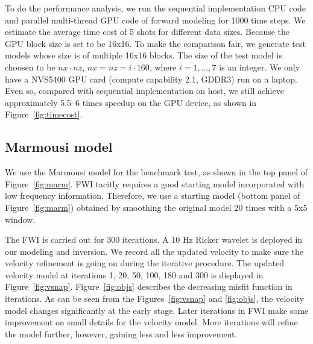 To do the performance analysis, we run the sequential implementation CPU code and parallel multi-thread GPU code of forward modeling for 1000 time steps. We estimate the average time cost of 5 shots for different data sizes. Because the GPU block size is set to be 16x16. To make the comparison fair, we generate test models whose size is of multiple 16x16 blocks. The size of the test model is choosen to be $nx\cdot nz$, $nx=nz=i\cdot160$, where $i=1,\ldots,7$ is an integer. We only have a NVS5400 GPU card (compute capability 2.1, GDDR3) run on a laptop. Even so, compared with sequential implementation on host, we still achieve approximately 5.5--6 times speedup on the GPU device, as shown in Figure~\ref{fig:timecost}. 




\subsection{Marmousi model}

We use the Marmousi model for the benchmark test, as shown in the top panel of Figure~\ref{fig:marm}.
FWI tacitly requires a good starting model incorporated with low frequency information. Therefore, we use a starting model (bottom panel of Figure~\ref{fig:marm}) obtained by smoothing the original model 20 times with a 5x5 window.

The FWI is carried out for 300 iterations. A 10 Hz Ricker wavelet is deployed in our modeling and inversion.  We record all the updated velocity to make sure the velocity refinement is going on during the iterative procedure. The updated velocity model at iterations 1, 20, 50, 100, 180 and 300 is displayed in Figure~\ref{fig:vsnap}. Figure~\ref{fig:objs} describes the decreasing misfit function in iterations. As can be seen from the Figures~\ref{fig:vsnap} and \ref{fig:objs}, the velocity model changes significantly at the early stage. Later iterations in FWI make some improvement on small details for the velocity model. More iterations will refine the model further, however, gaining less and less improvement.




